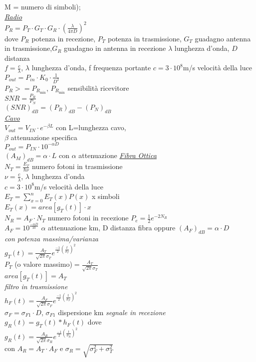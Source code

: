 \documentclass[a4paper]{article}
\begin{document}
\begin{multicols*}{3}
M = numero di simboli);\\
\underline{\textit{Radio}} \\
$P_R = P_T \cdot G_T \cdot G_R \cdot (\frac{\lambda}{4\pi D})^{2}$\\
dove $P_R$ potenza in recezione, $P_T$ potenza in trasmissione,
$G_T$ guadagno antenna in trasmissione,$G_R$ guadagno in antenna in recezione
$\lambda$ lunghezza d'onda, $D$ distanza\\
$f = \frac{c}{\lambda}$, $\lambda$ lunghezza d'onda, f frequenza portante
$c=3\cdot10^8$m/s  velocità della luce \\
$P_{out}=P_{in}\cdot K_0\cdot\frac{1}{D^2}$\\
$P_R >= P_{R_{\min}}$, $P_{R_{\min}}$ sensibilità ricevitore \\
$SNR=\frac{P_R}{P_N}$ \\
$(SNR)_{dB}=(P_R)_{dB}-(P_N)_{dB}$ \\
\underline{\textit{Cavo}} \\
$V_{out}=V_{IN}\cdot e^{-\beta L}$ con L=lunghezza cavo, \\
$\beta$ attenuazione specifica\\
$P_{out}=P_{IN}\cdot 10^{-\alpha D}$ \\
$(A_M)_{dB}=\alpha\cdot L$ con $\alpha$ attenuazione
\underline{\textit{Fibra Ottica}} \\
$N_T = \frac{E_T}{\hbar\nu}$ numero fotoni in trasmissione \\
$\nu = \frac{c}{\lambda}$, $\lambda$ lunghezza d'onda \\
$c=3\cdot10^8$m/s  velocità della luce \\
$E_T = \sum_{x=0}^{n}{E_T(x)P(x)}$ x simboli \\
$E_T(x) = area[g_T(t)]\cdot x$ \\
$N_R = A_F\cdot N_T$ numero fotoni in recezione
$P_e=\frac{1}{2}e^{-2N_R}$ \\
$A_F = 10^{\frac{-\alpha D}{10}}$ $\alpha$ attenuazione km, D distanza fibra
oppure ${(A_F)}_{dB}=\alpha\cdot D$ \\ 
\textit{con potenza massima/varianza }\\
$g_T(t)=\frac{A_T}{\sqrt{2\pi}\sigma_T}e^{\frac{-1}{2}{(\frac{t}{\sigma_T})}^{2}}$
\\ $P_T$ (o valore massimo)$=\frac{A_T}{\sqrt{2\pi}\sigma_T}$ \\
$area[g_T(t)] = A_T$ \\
\textit{filtro in trasmissione }\\
$h_F(t)=\frac{A_F}{\sqrt{2\pi}\sigma_F}e^{\frac{-1}{2}{(\frac{t}{\sigma_F})}^{2}}$ \\
$\sigma_F=\sigma_{F1} \cdot D$, $\sigma_{F1}$ dispersione km
\textit{segnale in recezione}\\ 
$g_R(t)=g_T(t)*h_F(t)$ dove \\
$g_R(t)=\frac{A_R}{\sqrt{2\pi}\sigma_R}e^{\frac{-1}{2}{(\frac{t}{\sigma_R})}^{2}}$
\\ con $A_R = A_T \cdot A_F$ e $\sigma_R = \sqrt{\sigma_F^2 + \sigma_T^2}$
\end{multicols*}
\end{document}
